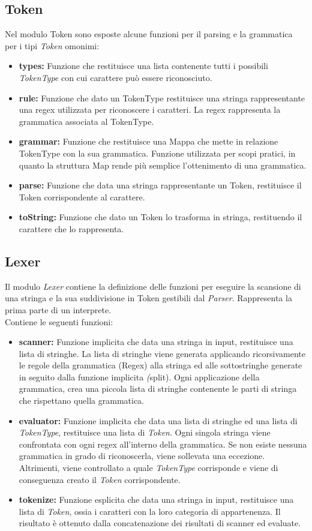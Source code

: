 \documentclass[\main/tesi.tex]{subfiles}
\begin{document}
\subsection{Token}
Nel modulo Token sono esposte alcune funzioni per il parsing e la grammatica per i tipi \textit{Token} omonimi:
\begin{itemize}
    \item \textbf{types:} Funzione che restituisce una lista contenente tutti i possibili \textit{TokenType} con cui carattere può essere riconosciuto.
    \item \textbf{rule:} Funzione che dato un TokenType restituisce una stringa rappresentante una regex utilizzata per riconoscere i caratteri. La regex rappresenta la grammatica associata al TokenType.
    \item \textbf{grammar:} Funzione che restituisce una Mappa che mette in relazione TokenType con la sua grammatica. Funzione utilizzata per scopi pratici, in quanto la struttura Map rende più semplice l'ottenimento di una grammatica.
    \item \textbf{parse:} Funzione che data una stringa rappresentante un Token, restituisce il Token corrispondente al carattere.
    \item \textbf{toString:} Funzione che dato un Token lo trasforma in stringa, restituendo il carattere che lo rappresenta.
\end{itemize}

\subsection{Lexer}
Il modulo \textit{Lexer} contiene la definizione delle funzioni per eseguire la scansione di una stringa e la sua suddivisione in Token gestibili dal \textit{Parser}. Rappresenta la prima parte di un interprete. \\
Contiene le seguenti funzioni:
\begin{itemize}
    \item \textbf{scanner:} Funzione implicita che data una stringa in input, restituisce una lista di stringhe. La lista di stringhe viene generata applicando ricorsivamente le regole della grammatica (Regex) alla stringa ed alle sottostringhe generate in seguito dalla funzione implicita \textit(split). Ogni applicazione della grammatica, crea una piccola lista di stringhe contenente le parti di stringa che rispettano quella grammatica.
    \item \textbf{evaluator:} Funzione implicita che data una lista di stringhe ed una lista di \textit{TokenType}, restituisce una lista di \textit{Token}. Ogni singola stringa viene confrontata con ogni regex all'interno della grammatica. Se non esiste nessuna grammatica in grado di riconoscerla, viene sollevata una eccezione. Altrimenti, viene controllato a quale \textit{TokenType} corrisponde e viene di conseguenza creato il \textit{Token} corrispondente.
    \item \textbf{tokenize:} Funzione esplicita che data una stringa in input, restituisce una lista di \textit{Token}, ossia i caratteri con la loro categoria di appartenenza. Il risultato è ottenuto dalla concatenazione dei risultati di scanner ed evaluate.
\end{itemize}
\end{document}

